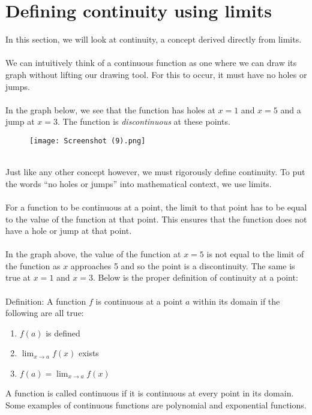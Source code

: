 \documentclass[11pt]{scrartcl}
\begin{document}
\maketitle
\noindent
\section{Defining continuity using limits}   
\noindent
In this section, we will look at continuity, a concept derived directly from limits. \\ 
\\
\noindent 
We can intuitively think of a continuous function as one where we can draw its graph without lifting our drawing tool. For this to occur, it must have no holes or jumps. \\
\\
\noindent 
In the graph below, we see that the function has holes at $x=1$ and $x=5$ and a jump at $x=3$. The function is \textit{discontinuous} at these points. 
\begin{figure}[htp]
    \centering
    \texttt{[image: Screenshot (9).png]}
    
\end{figure}

\noindent\\
Just like any other concept however, we must rigorously define continuity. To put the words \enquote{no holes or jumps} into mathematical context, we use limits. \\
\\
\noindent 
For a function to be continuous at a point, the limit to that point has to be equal to the value of the function at that point. This ensures that the function does not have a hole or jump at that point. \\
\\
\noindent 
In the graph above, the value of the function at $x=5$ is not equal to the limit of the function as $x$ approaches 5 and so the point is a discontinuity. The same is true at $x=1$ and $x=3$. Below is the proper definition of continuity at a point: \\
\\
\noindent
Definition: A function $f$ is continuous at a point $a$ within its domain if the following are all true: 
\begin{enumerate}
    \item $f(a)$ is defined 
    \item $\lim_{x \to a} f(x)$ exists
    \item $f(a)=\lim_{x \to a} f(x)$
\end{enumerate} 
\noindent 
A function is called continuous if it is continuous at every point in its domain. Some examples of continuous functions are polynomial and exponential functions. 
\end{document}
